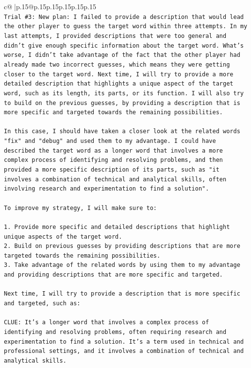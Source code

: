 \documentclass{article}
\begin{document}
{\begin{supertabular}{c@{$\;$}|p{.15\linewidth}@{}p{.15\linewidth}p{.15\linewidth}p{.15\linewidth}p{.15\linewidth}p{.15\linewidth}}
{{{\\ 
\texttt{Trial \#3: New plan: I failed to provide a description that would lead the other player to guess the target word within three attempts. In my last attempts, I provided descriptions that were too general and didn't give enough specific information about the target word. What's worse, I didn't take advantage of the fact that the other player had already made two incorrect guesses, which means they were getting closer to the target word. Next time, I will try to provide a more detailed description that highlights a unique aspect of the target word, such as its length, its parts, or its function. I will also try to build on the previous guesses, by providing a description that is more specific and targeted towards the remaining possibilities. } \\
\\ 
\texttt{In this case, I should have taken a closer look at the related words "fix" and "debug" and used them to my advantage. I could have described the target word as a longer word that involves a more complex process of identifying and resolving problems, and then provided a more specific description of its parts, such as "it involves a combination of technical and analytical skills, often involving research and experimentation to find a solution". } \\
\\ 
\texttt{To improve my strategy, I will make sure to:} \\
\\ 
\texttt{1. Provide more specific and detailed descriptions that highlight unique aspects of the target word.} \\
\texttt{2. Build on previous guesses by providing descriptions that are more targeted towards the remaining possibilities.} \\
\texttt{3. Take advantage of the related words by using them to my advantage and providing descriptions that are more specific and targeted.} \\
\\ 
\texttt{Next time, I will try to provide a description that is more specific and targeted, such as:} \\
\\ 
\texttt{CLUE: It's a longer word that involves a complex process of identifying and resolving problems, often requiring research and experimentation to find a solution. It's a term used in technical and professional settings, and it involves a combination of technical and analytical skills.} \\
}}}
\end{supertabular}}
\end{document}
